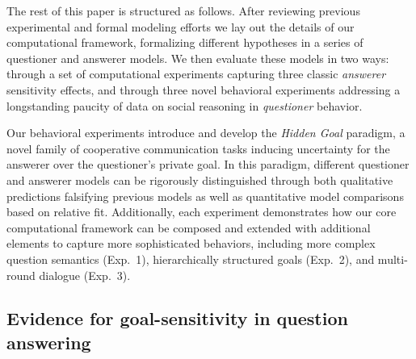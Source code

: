 \documentclass[11pt, floatsintext]{apa6}
\begin{document}
The rest of this paper is structured as follows. 
After reviewing previous experimental and formal modeling efforts we lay out the details of our computational framework, formalizing different hypotheses in a series of questioner and answerer models. 
We then evaluate these models in two ways: through a set of computational experiments capturing three classic \emph{answerer} sensitivity effects, and through three novel behavioral experiments addressing a longstanding paucity of data on social reasoning in \emph{questioner} behavior. 

Our behavioral experiments introduce and develop the \emph{Hidden Goal} paradigm, a novel family of cooperative communication tasks inducing uncertainty for the answerer over the questioner's private goal. 
In this paradigm, different questioner and answerer models can be rigorously distinguished through both qualitative predictions falsifying previous models as well as quantitative model comparisons based on relative fit. 
Additionally, each experiment demonstrates how our core computational framework can be composed and extended with additional elements to capture more sophisticated behaviors, including more complex question semantics (Exp.~1), hierarchically structured goals (Exp.~2), and multi-round dialogue (Exp.~3). 


\subsection{Evidence for goal-sensitivity in question answering}
\end{document}
